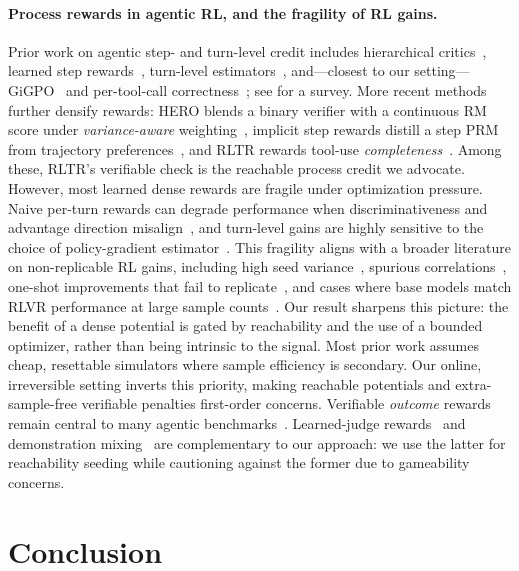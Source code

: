 \paragraph{Process rewards in agentic RL, and the fragility of RL gains.} Prior work on agentic step- and turn-level credit includes hierarchical critics~\citep{archer}, learned step rewards~\citep{steptool,sparl}, turn-level estimators~\citep{turnlevel}, and---closest to our setting---GiGPO~\citep{gigpo} and per-tool-call correctness~\citep{toolrl}; see \citet{creditsurvey} for a survey. More recent methods further densify rewards: HERO blends a binary verifier with a continuous RM score under \emph{variance-aware} weighting~\citep{hero}, implicit step rewards distill a step PRM from trajectory preferences~\citep{implicitstep}, and RLTR rewards tool-use \emph{completeness}~\citep{rltr}. Among these, RLTR's verifiable check is the reachable process credit we advocate. However, most learned dense rewards are fragile under optimization pressure. Naive per-turn rewards can degrade performance when discriminativeness and advantage direction misalign~\citep{rewardcalib}, and turn-level gains are highly sensitive to the choice of policy-gradient estimator~\citep{practitioner}. This fragility aligns with a broader literature on non-replicable RL gains, including high seed variance~\citep{sober}, spurious correlations~\citep{spurious}, one-shot improvements that fail to replicate~\citep{oneshot}, and cases where base models match RLVR performance at large sample counts~\citep{rlbeyond}. Our result sharpens this picture: the benefit of a dense potential is gated by reachability and the use of a bounded optimizer, rather than being intrinsic to the signal. Most prior work assumes cheap, resettable simulators where sample efficiency is secondary. Our online, irreversible setting inverts this priority, making reachable potentials and extra-sample-free verifiable penalties first-order concerns. Verifiable \emph{outcome} rewards remain central to many agentic benchmarks~\citep{taubench,tau2bench,swegym,swerl}. Learned-judge rewards~\citep{selfreward,rlaif,constitutional,llmjudge} and demonstration mixing~\citep{luffy} are complementary to our approach: we use the latter for reachability seeding while cautioning against the former due to gameability concerns.

\section{Conclusion}

